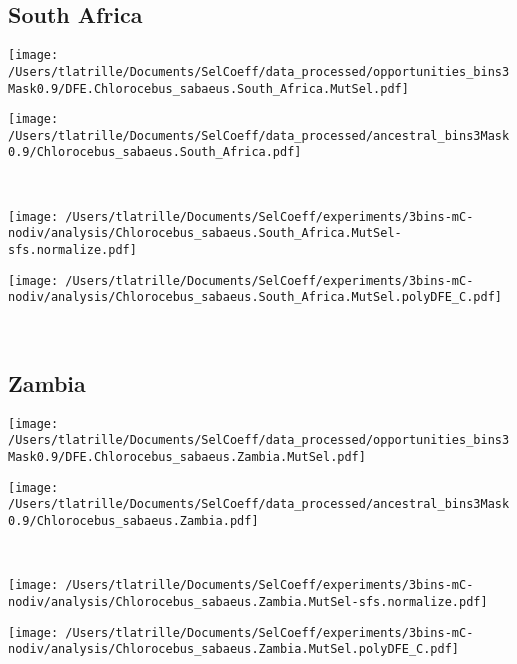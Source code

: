\documentclass{article}
\begin{document}
    \subsection{South Africa}

    \begin{minipage}{0.49\linewidth}
        \texttt{[image: /Users/tlatrille/Documents/SelCoeff/data\_processed/opportunities\_bins3Mask0.9/DFE.Chlorocebus\_sabaeus.South\_Africa.MutSel.pdf]}
    \end{minipage}
    \begin{minipage}{0.49\linewidth}
        \texttt{[image: /Users/tlatrille/Documents/SelCoeff/data\_processed/ancestral\_bins3Mask0.9/Chlorocebus\_sabaeus.South\_Africa.pdf]}
    \end{minipage}
    \\
    \begin{minipage}{0.49\linewidth}
        \texttt{[image: /Users/tlatrille/Documents/SelCoeff/experiments/3bins-mC-nodiv/analysis/Chlorocebus\_sabaeus.South\_Africa.MutSel-sfs.normalize.pdf]}
    \end{minipage}
    \begin{minipage}{0.49\linewidth}
        \texttt{[image: /Users/tlatrille/Documents/SelCoeff/experiments/3bins-mC-nodiv/analysis/Chlorocebus\_sabaeus.South\_Africa.MutSel.polyDFE\_C.pdf]}
    \end{minipage}
    \\
    \subsection{Zambia}

    \begin{minipage}{0.49\linewidth}
        \texttt{[image: /Users/tlatrille/Documents/SelCoeff/data\_processed/opportunities\_bins3Mask0.9/DFE.Chlorocebus\_sabaeus.Zambia.MutSel.pdf]}
    \end{minipage}
    \begin{minipage}{0.49\linewidth}
        \texttt{[image: /Users/tlatrille/Documents/SelCoeff/data\_processed/ancestral\_bins3Mask0.9/Chlorocebus\_sabaeus.Zambia.pdf]}
    \end{minipage}
    \\
    \begin{minipage}{0.49\linewidth}
        \texttt{[image: /Users/tlatrille/Documents/SelCoeff/experiments/3bins-mC-nodiv/analysis/Chlorocebus\_sabaeus.Zambia.MutSel-sfs.normalize.pdf]}
    \end{minipage}
    \begin{minipage}{0.49\linewidth}
        \texttt{[image: /Users/tlatrille/Documents/SelCoeff/experiments/3bins-mC-nodiv/analysis/Chlorocebus\_sabaeus.Zambia.MutSel.polyDFE\_C.pdf]}
    \end{minipage}
    \\
\end{document}
